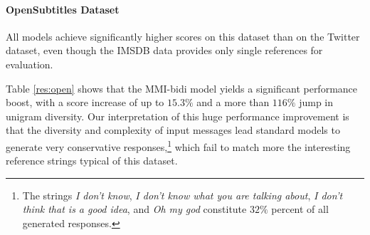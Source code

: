 \paragraph{OpenSubtitles Dataset}
All models achieve significantly higher \bleu scores on this dataset than on the Twitter dataset, even though the IMSDB data provides only single references for evaluation. 

Table \ref{res:open} shows that the MMI-bidi model
yields a significant performance boost, with a \bleu score increase of up
to $15.3\%$ and a more than $116\%$ jump in unigram diversity. 
Our interpretation of this huge performance improvement is that the
diversity and complexity of input messages lead 
standard \sts models to generate very conservative responses,\footnote{The strings 
\textit{I don't know}, \textit{I don't know what you are talking about},
\textit{I don't think that is a good idea}, and
\textit{Oh my god} constitute
$32\%$ percent of all generated responses.} which fail to match more the interesting reference strings typical of this dataset.

